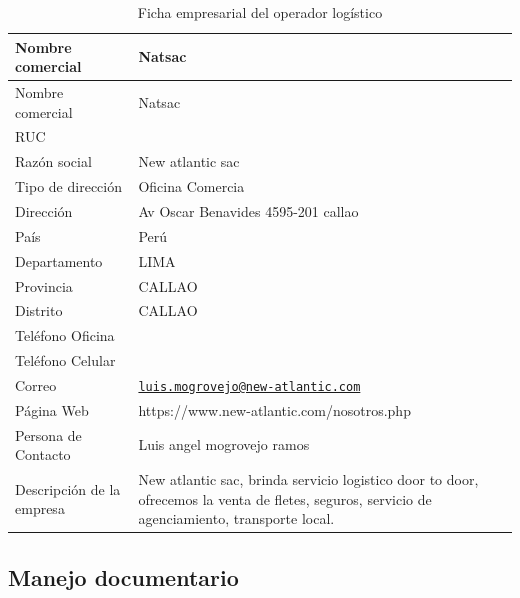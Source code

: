 \documentclass[
  stu,
  floatsintext,
  longtable,
  a4paper,
  nolmodern,
  notxfonts,
  notimes,
  12pt,
  colorlinks=true,linkcolor=blue,citecolor=blue,urlcolor=blue]{apa7}
\begin{document}
\begin{longtable}[]{@{}
  >{\raggedright\arraybackslash}p{}
  >{\raggedright\arraybackslash}p{}@{}}
\caption{Ficha empresarial del operador logístico}\tabularnewline
\toprule\noalign{}
\begin{minipage}[b]{\linewidth}\raggedright
Nombre comercial
\end{minipage} & \begin{minipage}[b]{\linewidth}\raggedright
Natsac
\end{minipage} \\
\midrule\noalign{}
\endfirsthead
\toprule\noalign{}
\begin{minipage}[b]{\linewidth}\raggedright
Nombre comercial
\end{minipage} & \begin{minipage}[b]{\linewidth}\raggedright
Natsac
\end{minipage} \\
\midrule\noalign{}
\endhead
\bottomrule\noalign{}
\endlastfoot
RUC & 20562763351 \\
Razón social & New atlantic sac \\
Tipo de dirección & Oficina Comercia \\
Dirección & Av Oscar Benavides 4595-201 callao \\
País & Perú \\
Departamento & LIMA \\
Provincia & CALLAO \\
Distrito & CALLAO \\
Teléfono Oficina & 14697815 \\
Teléfono Celular & 981366393 \\
Correo &
\href{mailto:luis.mogrovejo@new-atlantic.com}{\nolinkurl{luis.mogrovejo@new-atlantic.com}} \\
Página Web & https://www.new-atlantic.com/nosotros.php \\
Persona de Contacto & Luis angel mogrovejo ramos \\
Descripción de la empresa & New atlantic sac, brinda servicio logistico
door to door, ofrecemos la venta de fletes, seguros, servicio de
agenciamiento, transporte local. \\
\end{longtable}

\subsection{Manejo documentario}\label{manejo-documentario}
\end{document}
